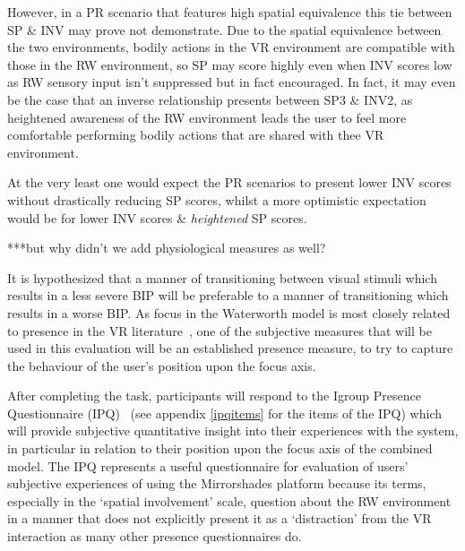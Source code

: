 However, in a PR scenario that features high spatial equivalence this tie between SP \& INV may prove not demonstrate. Due to the spatial equivalence between the two environments, bodily actions in the VR environment are compatible with those in the RW environment, so SP may score highly even when INV scores low as RW sensory input isn't suppressed but in fact encouraged. In fact, it may even be the case that an inverse relationship presents between SP3 \& INV2, as heightened awareness of the RW environment leads the user to feel more comfortable performing bodily actions that are shared with thee VR environment.

At the very least one would expect the PR scenarios to present lower INV scores without drastically reducing SP scores, whilst a more optimistic expectation would be for lower INV scores \& \textit{heightened} SP scores.















***but why didn't we add physiological measures as well?

















It is hypothesized that a manner of transitioning between visual stimuli which results in a less severe BIP will be preferable to a manner of transitioning which results in a worse BIP. As focus in the Waterworth model is most closely related to presence in the VR literature~\cite{Waterworth2001}, one of the subjective measures that will be used in this evaluation will be an established presence measure, to try to capture the behaviour of the user's position upon the focus axis.





After completing the task, participants will respond to the Igroup Presence Questionnaire (IPQ)~\cite{Schubert2001} (see appendix \ref{ipqitems} for the items of the IPQ) which will provide subjective quantitative insight into their experiences with the system, in particular in relation to their position upon the focus axis of the combined model. The IPQ represents a useful questionnaire for evaluation of users' subjective experiences of using the Mirrorshades platform because its terms, especially in the `spatial involvement' scale, question about the RW environment in a manner that does not explicitly present it as a `distraction' from the VR interaction as many other presence questionnaires do.



